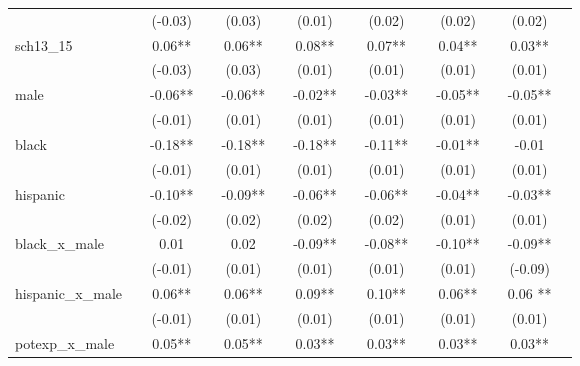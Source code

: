 \documentclass{article}
\begin{document}
\begin{landscape}
\begin{table}[ht]
\begin{tabular}{llclclclclclcl}
                       &  & (-0.03)       &     & (0.03)      &  & (0.01)        &      & (0.02)       &  & (0.02)        &     & (0.02)        &  \\
sch13\_15              &  & 0.06**       &     & 0.06**      &  & 0.08**         &      & 0.07**       &  & 0.04**       &     & 0.03**       &  \\
                       &  & (-0.03)       &     & (0.03)       &  & (0.01)        &      & (0.01)        &  & (0.01)        &     & (0.01)        &  \\
male                   &  & -0.06**      &     & -0.06**      &  & -0.02**       &      & -0.03**       &  & -0.05**      &     & -0.05**      &  \\
                       &  & (-0.01)       &     & (0.01)       &  & (0.01)        &      & (0.01)        &  & (0.01)        &     & (0.01)        &  \\
black                  &  & -0.18**      &     & -0.18**     &  & -0.18**       &      & -0.11**      &  & -0.01**      &     & -0.01       &  \\
                       &  & (-0.01)       &     & (0.01)       &  & (0.01)        &      & (0.01)       &  & (0.01)       &     & (0.01)       &  \\
hispanic               &  & -0.10**      &     & -0.09**     &  & -0.06**       &      & -0.06**      &  & -0.04**      &     & -0.03**      &  \\
                       &  & (-0.02)      &     & (0.02)      &  & (0.02)        &      & (0.02)        &  & (0.01)        &     & (0.01)        &  \\
black\_x\_male         &  & 0.01        &     & 0.02      &  & -0.09**       &      & -0.08**      &  & -0.10**        &     & -0.09**       &  \\
                       &  & (-0.01)       &     & (0.01)      &  & (0.01)         &      & (0.01)       &  & (0.01)        &     & (-0.09)      &  \\
hispanic\_x\_male      &  & 0.06**       &     & 0.06**       &  & 0.09**        &      & 0.10**       &  & 0.06**       &     & 0.06 **       &  \\
                       &  & (-0.01)    &     & (0.01)       &  & (0.01)        &      & (0.01)       &  & (0.01)       &     & (0.01)       &  \\
potexp\_x\_male        &  & 0.05**       &     & 0.05**      &  & 0.03**        &      & 0.03**       &  & 0.03**       &     & 0.03**        &  \\

\end{tabular}
\end{table}
\end{landscape}
\end{document}
